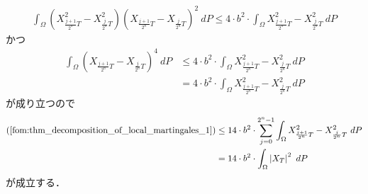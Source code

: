 \begin{sketch}
\begin{description}
\begin{align}
					\int_\Omega \left( X^2_{\frac{j+1}{2^n}T} - X^2_{\frac{j}{2^n}T} \right) \left(X_{\frac{j+1}{2^n}T} - X_{\frac{j}{2^n}T}\right)^2\ dP
					\leq 4 \cdot b^2 \cdot \int_\Omega X^2_{\frac{j+1}{2^n}T} - X^2_{\frac{j}{2^n}T}\ dP
				\end{align}
				かつ
				\begin{align}
					\int_\Omega \left(X_{\frac{j+1}{2^n}T} - X_{\frac{j}{2^n}T}\right)^4\ dP
					&\leq 4 \cdot b^2 \cdot \int_\Omega X^2_{\frac{j+1}{2^n}T} - X^2_{\frac{j}{2^n}T}\ dP \\
					&= 4 \cdot b^2 \cdot \int_\Omega X^2_{\frac{j+1}{2^n}T} - X^2_{\frac{j}{2^n}T}\ dP
				\end{align}
				が成り立つので
				\begin{align}
					(\refeq{fom:thm_decomposition_of_local_martingales_1})
					&\leq 14 \cdot b^2 \cdot \sum_{j=0}^{2^n-1} \int_\Omega X^2_{\frac{j+1}{2^n}T} - X^2_{\frac{j}{2^n}T}\ dP \\
					&= 14 \cdot b^2 \cdot \int_\Omega \left|X_T\right|^2\ dP
				\end{align}
				が成立する．
				

\end{description}
\end{sketch}
